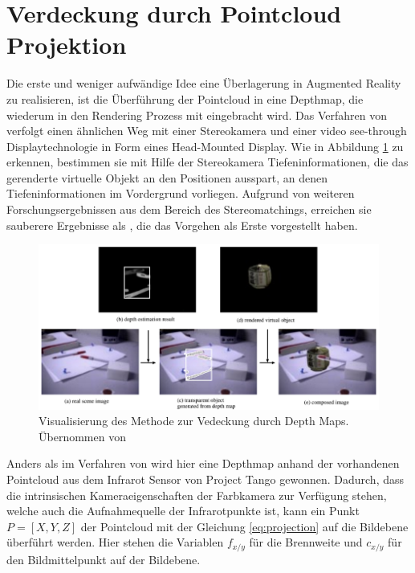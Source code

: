 \section{Verdeckung durch Pointcloud Projektion} \label{sec:pc-projection}

Die erste und weniger aufwändige Idee eine Überlagerung in Augmented Reality zu realisieren, ist die Überführung der Pointcloud in eine Depthmap, die wiederum in den Rendering Prozess mit eingebracht wird. Das Verfahren von \citet{kanbara2000stereoscopic} verfolgt einen ähnlichen Weg mit einer Stereokamera und einer video see-through Displaytechnologie in Form eines Head-Mounted Display. Wie in Abbildung \ref{fig:stereo-depth-map} zu erkennen, bestimmen sie mit Hilfe der Stereokamera Tiefeninformationen, die das gerenderte virtuelle Objekt an den Positionen ausspart, an denen Tiefeninformationen im Vordergrund vorliegen. Aufgrund von weiteren Forschungsergebnissen aus dem Bereich des Stereomatchings, erreichen sie sauberere Ergebnisse als \citet{wloka1995resolving}, die das Vorgehen als Erste vorgestellt haben.

\begin{figure}[h]
  \centering
	\includegraphics[width=1.0\textwidth]{content/images/methods/stereo-depth-map.png} 
  \caption{Visualisierung des Methode zur Vedeckung durch Depth Maps. Übernommen von \citet{kanbara2000stereoscopic}}
  \label{fig:stereo-depth-map}
\end{figure}

Anders als im Verfahren von \citet{kanbara2000stereoscopic} wird hier eine Depthmap anhand der vorhandenen Pointcloud aus dem Infrarot Sensor von Project Tango gewonnen. Dadurch, dass die intrinsischen Kameraeigenschaften der Farbkamera zur Verfügung stehen, welche auch die Aufnahmequelle der Infrarotpunkte ist, kann ein Punkt \(P = [X, Y, Z]\) der Pointcloud mit der Gleichung \ref{eq:projection} auf die Bildebene überführt werden. Hier stehen die Variablen \(f_{x/y}\) für die Brennweite und \(c_{x/y}\) für den Bildmittelpunkt auf der Bildebene. \citep{Tango90:online}

